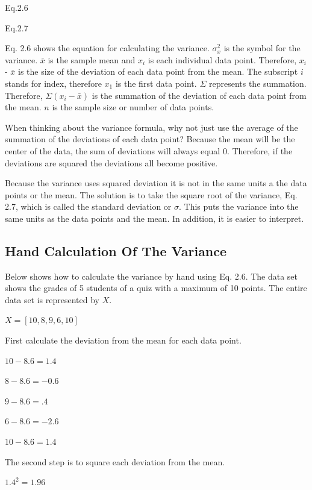\documentclass[]{book}
\theoremstyle{definition}
\theoremstyle{definition}
\theoremstyle{definition}
\theoremstyle{remark}
\begin{document}
Eq.2.6

Eq.2.7

Eq. 2.6 shows the equation for calculating the variance.
\(\sigma^2_{x}\) is the symbol for the variance. \(\bar{x}\) is the
sample mean and \(x_{i}\) is each individual data point. Therefore,
\(x_{i}\) - \(\bar{x}\) is the size of the deviation of each data point
from the mean. The subscript \(i\) stands for index, therefore \(x_{1}\)
is the first data point. \(\Sigma\) represents the summation. Therefore,
\(\Sigma(x_{i} - \bar{x})\) is the summation of the deviation of each
data point from the mean. \(n\) is the sample size or number of data
points.

When thinking about the variance formula, why not just use the average
of the summation of the deviations of each data point? Because the mean
will be the center of the data, the sum of deviations will always equal
0. Therefore, if the deviations are squared the deviations all become
positive.

Because the variance uses squared deviation it is not in the same units
a the data points or the mean. The solution is to take the square root
of the variance, Eq. 2.7, which is called the standard deviation or
\(\sigma\). This puts the variance into the same units as the data
points and the mean. In addition, it is easier to interpret.

\hypertarget{hand-calculation-of-the-variance}{%
\subsection{Hand Calculation Of The
Variance}\label{hand-calculation-of-the-variance}}

Below shows how to calculate the variance by hand using Eq. 2.6. The
data set shows the grades of 5 students of a quiz with a maximum of 10
points. The entire data set is represented by \(X\).

\(X = [10, 8, 9, 6, 10]\)

First calculate the deviation from the mean for each data point.

\(10 - 8.6 = 1.4\)

\(8 - 8.6 = -0.6\)

\(9 - 8.6 = .4\)

\(6 - 8.6 = -2.6\)

\(10 - 8.6 = 1.4\)

The second step is to square each deviation from the mean.

\(1.4^2 = 1.96\)
\end{document}
